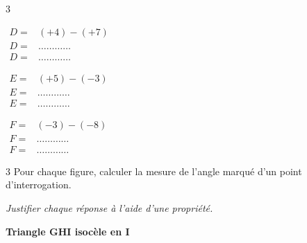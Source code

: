 \documentclass[a4paper]{book}
\begin{document}
{\begin{exerciceNote}{3}
        \begin{minipage}{0.3\linewidth}
            $\begin{array}{ll}
                D = & (+4) - (+7) \\[2ex]
                D = & \dots\dots\dots\dots \\[2ex]
                D = & \dots\dots\dots\dots
            \end{array}$
        \end{minipage}
        \hfill \vline \hfill
        \begin{minipage}{0.33\linewidth}
            $\begin{array}{ll}
                E = & (+5) - (-3) \\[2ex]
                E = & \dots\dots\dots\dots \\[2ex]
                E = & \dots\dots\dots\dots
            \end{array}$
        \end{minipage}
        \hfill \vline \hfill
        \begin{minipage}{0.3\linewidth}
            $\begin{array}{ll}
                F = & (-3) - (-8) \\[2ex]
                F = & \dots\dots\dots\dots \\[2ex]
                F = & \dots\dots\dots\dots
            \end{array}$
        \end{minipage}
    \end{exerciceNote}


    \begin{exerciceNote}{3}
        Pour chaque figure, calculer la mesure de l'angle marqué d'un point d'interrogation. 
        
        \textit{Justifier chaque réponse à l'aide d'une propriété.}

        \begin{minipage}{0.32\linewidth}
             \begin{center}     
                \textbf{Triangle GHI isocèle en I} 
           
            \end{center}
            

\end{minipage}
\end{exerciceNote}}
\end{document}
